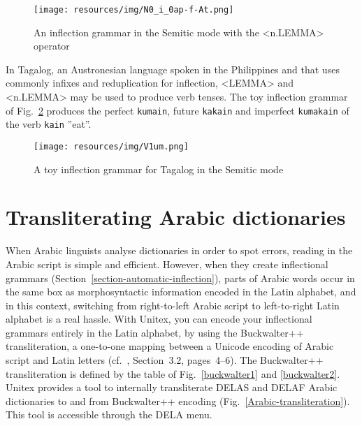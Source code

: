 \begin{figure}[!ht]
\begin{center}
\texttt{[image: resources/img/N0\_i\_0ap-f-At.png]}
\caption{An inflection grammar in the Semitic mode with the <n.LEMMA> operator\label{n.LEMMA-operator}}
\end{center}
\end{figure}

\bigskip
\noindent In Tagalog, an Austronesian language spoken in the Philippines and that uses commonly infixes
and reduplication for inflection, <LEMMA> and <n.LEMMA> may be used to produce verb tenses.
The toy inflection grammar of Fig.~\ref{tagalog} produces the perfect \verb+kumain+, future \verb+kakain+
and imperfect \verb+kumakain+ of the verb \verb+kain+ ''eat''.

\begin{figure}[!ht]
\begin{center}
\texttt{[image: resources/img/V1um.png]}
\caption{A toy inflection grammar for Tagalog in the Semitic mode\label{tagalog}}
\end{center}
\end{figure}



\section{Transliterating Arabic dictionaries}
\label{transliteration-Arabic}

When Arabic linguists analyse dictionaries in order to spot errors,
reading in the Arabic script is simple and efficient. However, when they
create inflectional grammars (Section~\ref{section-automatic-inflection}), parts of
Arabic words occur in the same box as morphosyntactic information encoded
in the Latin alphabet, and in this context, switching from right-to-left Arabic script
to left-to-right Latin alphabet is a real hassle. With Unitex, you can encode your
inflectional grammars entirely in the Latin alphabet, by using the Buckwalter++
transliteration, a one-to-one mapping between a Unicode
encoding of Arabic script and Latin letters (cf.~\cite{neme2011},
Section~3.2, pages~4--6). The Buckwalter++ transliteration is defined by the table
of Fig.~\ref{buckwalter1} and \ref{buckwalter2}.
Unitex provides a tool to internally transliterate DELAS and DELAF Arabic
dictionaries to and from Buckwalter++ encoding
(Fig.~\ref{Arabic-transliteration}). This tool is accessible through the DELA menu.

